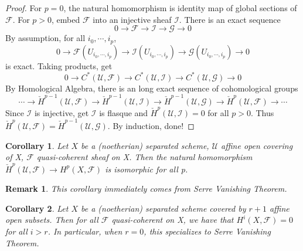 \documentclass{ctexart}
\newtheorem{remark}{Remark}[section]
\newtheorem{corollary}{Corollary}[section]
\begin{document}
\begin{proof}
    For $p = 0$, the natural homomorphism is identity map of global sections of $\mathcal{F}$.
    For $p > 0$, embed $\mathcal{F}$ into an injective sheaf $\mathcal{I}$.
    There is an exact sequence
    \begin{equation*}
        0 \longrightarrow \mathcal{F} \longrightarrow \mathcal{I} \longrightarrow \mathcal{G} \longrightarrow 0
    \end{equation*}
    By assumption, for all $i_{0}, \cdots, i_{p}$,
    \begin{equation*}
        0 \longrightarrow \mathcal{F}(U_{i_{0}, \cdots, i_{p}})\longrightarrow \mathcal{I}(U_{i_{0}, \cdots, i_{p}}) \longrightarrow \mathcal{G}(U_{i_{0}, \cdots, i_{p}}) \longrightarrow 0
    \end{equation*}
    is exact.
    Taking products, get
    \begin{equation*}
        0 \longrightarrow C^{\ast}(\mathcal{U}, \mathcal{F}) \longrightarrow C^{\ast}(\mathcal{U}, \mathcal{I}) \longrightarrow C^{\ast}(\mathcal{U}, \mathcal{G}) \longrightarrow 0
    \end{equation*}
    By Homological Algebra, there is an long exact sequence of cohomological groups
    \begin{equation*}
        \cdots \longrightarrow \check{H}^{p - 1}(\mathcal{U}, \mathcal{F}) \longrightarrow \check{H}^{p - 1}(\mathcal{U}, \mathcal{I}) \longrightarrow \check{H}^{p - 1}(\mathcal{U}, \mathcal{G}) \longrightarrow \check{H}^{p}(\mathcal{U}, \mathcal{F}) \longrightarrow \cdots
    \end{equation*}
    Since $\mathcal{I}$ is injective, get $\mathcal{I}$ is flasque and $\check{H}^{p}(\mathcal{U}, \mathcal{I}) = 0$ for all $p > 0$.
    Thus $\check{H}^{p}(\mathcal{U}, \mathcal{F}) = \check{H}^{p - 1}(\mathcal{U}, \mathcal{G})$.
    By induction, done!
\end{proof}
\begin{corollary}
    Let $X$ be a (noetherian) separated scheme, $\mathcal{U}$ affine open covering of X, $\mathcal{F}$ quasi-coherent sheaf on X.
    Then the natural homomorphism $\check{H}^{p}(\mathcal{U}, \mathcal{F}) \longrightarrow H^{p}(X, \mathcal{F})$ is isomorphic for all p.
    \label{Corollary 7.6}
\end{corollary}
\begin{remark}
    This corollary immediately comes from Serre Vanishing Theorem.
\end{remark}
\begin{corollary}
    Let $X$ be a (noetherian) separated scheme covered by $r + 1$ affine open subsets.
    Then for all $\mathcal{F}$ quasi-coherent on X, we have that $H^{i}(X, \mathcal{F}) = 0$ for all $i > r$.
    In particular, when $r = 0$, this specializes to Serre Vanishing Theorem.
    \label{Corollary 7.7}
\end{corollary}
\end{document}

